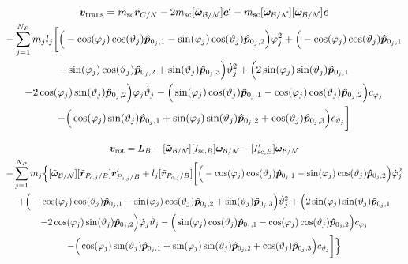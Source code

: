 \begin{multline}
	\bm v_{\text{trans}} = m_{\text{sc}}\ddot{\bm r}_{C/N} - 2m_{\text{sc}}[\tilde{\bm\omega}_{\cal B/N}] \bm c'
	-m_{\text{sc}}[\tilde{\bm\omega}_{\cal B/N}][\tilde{\bm\omega}_{\cal B/N}]\bm{c}
	\\-\sum_{j=1}^{N_{P}}m_j l_j \bigg[
	\Big(-\cos(\varphi_j)\cos(\vartheta_j)\bm{\hat{p}}_{0_j,1}-\sin(\varphi_j)\cos(\vartheta_j)\bm{\hat{p}}_{0_j,2}\Big)\dot{\varphi}_j^2
	+\Big(-\cos(\varphi_j)\cos(\vartheta_j)\bm{\hat{p}}_{0_j,1}\\-\sin(\varphi_j)\cos(\vartheta_j)\bm{\hat{p}}_{0_j,2}+\sin(\vartheta_j)\bm{\hat{p}}_{0_j,3} \Big)\dot{\vartheta}_j^2 +
	\Big(2\sin(\varphi_j)\sin(\vartheta_j)\bm{\hat{p}}_{0_j,1}\\ -2\cos(\varphi_j)\sin(\vartheta_j)\bm{\hat{p}}_{0_j,2}\Big)\dot{\varphi}_j\dot{\vartheta}_j
	-\Big(\sin(\varphi_j)\cos(\vartheta_j)\bm{\hat{p}}_{0_j,1}-\cos(\varphi_j)\cos(\vartheta_j)\bm{\hat{p}}_{0_j,2}\Big)c_{\varphi_j}\\ - \Big(\cos(\varphi_j)\sin(\vartheta_j)\bm{\hat{p}}_{0_j,1}+\sin(\varphi_j)\sin(\vartheta_j)\bm{\hat{p}}_{0_j,2}+\cos(\vartheta_j)\bm{\hat{p}}_{0_j,3}\Big) c_{\vartheta_j}
	\bigg]
\end{multline}

\begin{multline}
	\bm v_{\text{rot}} = 	\bm{L}_B-[\bm{\tilde{\omega}}_{\cal B/N}] [I_{\text{sc},B}] \bm\omega_{\cal B/N}
	- [I'_{\text{sc},B}] \bm\omega_{\cal B/N}\\- \sum\limits_{j=1}^{N_P} m_j \Big\{[\tilde{\bm\omega}_{\cal B/N}] [\tilde{\bm{r}}_{P_{c,j}/B}] \bm{r}'_{P_{c,j}/B}
	+l_j[\tilde{\bm{r}}_{P_{c,j}/B}]\bigg[
	\Big(-\cos(\varphi_j)\cos(\vartheta_j)\bm{\hat{p}}_{0_j,1} -\sin(\varphi_j)\cos(\vartheta_j)\bm{\hat{p}}_{0_j,2}\Big)\dot{\varphi}_j^2
	\\+\Big(-\cos(\varphi_j)\cos(\vartheta_j)\bm{\hat{p}}_{0_j,1}-\sin(\varphi_j)\cos(\vartheta_j)\bm{\hat{p}}_{0_j,2}+\sin(\vartheta_j)\bm{\hat{p}}_{0_j,3} \Big)\dot{\vartheta}_j^2 +
	\Big(2\sin(\varphi_j)\sin(\vartheta_j)\bm{\hat{p}}_{0_j,1}\\ -2\cos(\varphi_j)\sin(\vartheta_j)\bm{\hat{p}}_{0_j,2}\Big)\dot{\varphi}_j\dot{\vartheta}_j
	-\Big(\sin(\varphi_j)\cos(\vartheta_j)\bm{\hat{p}}_{0_j,1} -\cos(\varphi_j)\cos(\vartheta_j)\bm{\hat{p}}_{0_j,2}\Big)c_{\varphi_j} \\-   \Big(\cos(\varphi_j)\sin(\vartheta_j)\bm{\hat{p}}_{0_j,1}+\sin(\varphi_j)\sin(\vartheta_j)\bm{\hat{p}}_{0_j,2}+\cos(\vartheta_j)\bm{\hat{p}}_{0_j,3}\Big) c_{\vartheta_j}
	\bigg]\Big\}
\end{multline}

